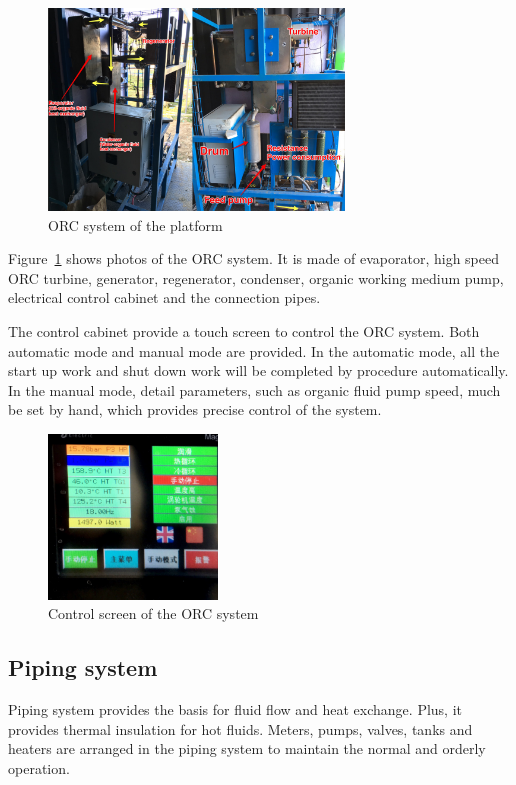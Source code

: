 \begin{figure}[!ht]
\centering
\includegraphics[width=0.7\textwidth]{fig/ORCsystem.jpg}
\caption{ORC system of the platform}\label{fig:ORCsystem}
\end{figure}
Figure~\ref{fig:ORCsystem} shows photos of the ORC system. It is made of evaporator, high speed ORC turbine, generator, regenerator, condenser, organic working medium pump, electrical control cabinet and the connection pipes.

The control cabinet provide a touch screen to control the ORC system. Both automatic mode and manual mode are provided. In the automatic mode, all the start up work and shut down work will be completed by procedure automatically. In the manual mode, detail parameters, such as organic fluid pump speed, much be set by hand, which provides precise control of the system.

\begin{figure}[!ht]
\centering
\includegraphics[width=0.4\textwidth]{fig/ControlCabinet}
\caption{Control screen of the ORC system}\label{fig:ControlCabinet}
\end{figure}

\subsection{Piping system}

Piping system provides the basis for fluid flow and heat exchange. Plus, it provides thermal insulation for hot fluids. Meters, pumps, valves, tanks and heaters are arranged in the piping system to maintain the normal and orderly operation.

